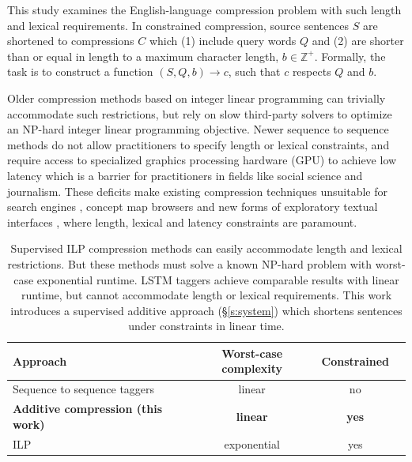 \documentclass[11pt,a4paper]{article}
\begin{document}
This study examines the English-language compression problem with such length and lexical requirements. In constrained compression, source sentences $S$ are shortened to compressions $C$ which (1) include query words $Q$ and (2) are shorter than or equal in length to a maximum character length, $b \in \mathbb{Z}^{+}$. Formally, the task is to construct a function $(S,Q,b) \rightarrow c$, such that $c$ respects $Q$ and $b$.

Older compression methods  \cite{clarke2008global,filippova2013overcoming} based on integer linear programming can trivially accommodate such restrictions, but rely on slow third-party solvers to optimize an NP-hard integer linear programming objective\label{s:relatedwork}. Newer sequence to sequence methods \cite{filippova2015sentence} do not allow practitioners to specify length or lexical constraints, and require access to specialized graphics processing hardware (GPU) to achieve low latency which is a barrier for practitioners in fields like social science and journalism. These deficits make existing compression techniques unsuitable for search engines \cite{hearst2009search}, concept map browsers \cite{falke2017graphdocexplore} and new forms of exploratory textual interfaces \cite{marchionini2006exploratory}, where length, lexical and latency constraints are paramount. 

\begin{table}[htb!]
\begin{tabular}{lccc}
\textbf{Approach} & \textbf{Worst-case complexity} & \textbf{Constrained}  \\ \hline
Sequence to sequence taggers \cite{filippova2015sentence}   & linear              & no         \\   
\textbf{Additive compression (this work)}  & \textbf{linear}     &      \textbf{yes}   \\
ILP    \cite{filippova2013overcoming,Wang2017CanSH}       &   exponential    & yes      \\
\end{tabular}
\caption{Supervised ILP compression methods \cite{clarke2008global,filippova2013overcoming,Wang2017CanSH} can easily accommodate length and lexical restrictions. But these methods must solve a known NP-hard problem with worst-case exponential runtime. LSTM taggers \cite{filippova2015sentence} achieve comparable results with linear runtime, but cannot accommodate length or lexical requirements. This work introduces a supervised additive approach (\S\ref{s:system}) which shortens sentences under constraints in linear time.} 
\label{t:algos}
\end{table}
\end{document}
